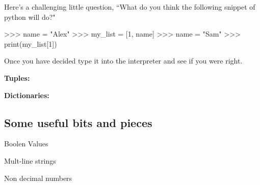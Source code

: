 Here's a challenging little question, ``What do you think the following snippet of python will do?" 

\begin{python}
>>> name = "Alex"
>>> my_list = [1, name]
>>> name = "Sam"
>>> print(my_list[1])
\end{python}

Once you have decided type it into the interpreter and see if you were right.


\textbf{Tuples:}

\textbf{Dictionaries:}



\subsection{Some useful bits and pieces}

Boolen Values 

Mult-line strings

Non decimal numbers
